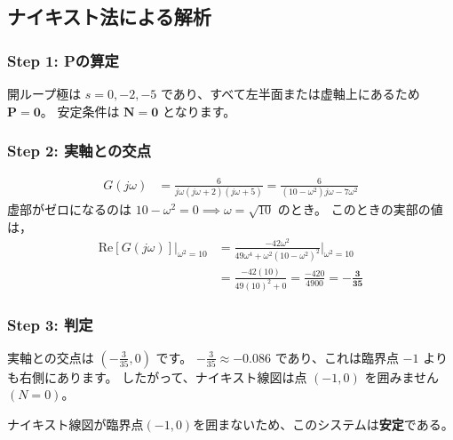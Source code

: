 \documentclass[11pt,a4paper]{ltjsarticle}
\begin{document}
\subsection{ナイキスト法による解析}
\subsubsection{Step 1: Pの算定}
開ループ極は $s=0, -2, -5$ であり、すべて左半面または虚軸上にあるため $\bm{P=0}$。
安定条件は $\bm{N=0}$ となります。

\subsubsection{Step 2: 実軸との交点}
\begin{align*}
G(j\omega) &= \frac{6}{j\omega(j\omega+2)(j\omega+5)} = \frac{6}{(10-\omega^2)j\omega - 7\omega^2}
\end{align*}
虚部がゼロになるのは $10-\omega^2=0 \implies \omega = \sqrt{10}$ のとき。
このときの実部の値は，
\begin{align*}
\text{Re}[G(j\omega)]|_{\omega^2=10} &= \frac{-42\omega^2}{49\omega^4 + \omega^2(10-\omega^2)^2} |_{\omega^2=10} \\
&= \frac{-42(10)}{49(10)^2 + 0} = \frac{-420}{4900} = \bm{-\frac{3}{35}}
\end{align*}

\subsubsection{Step 3: 判定}
実軸との交点は $(-\frac{3}{35}, 0)$ です。
$-\frac{3}{35} \approx -0.086$ であり、これは臨界点 $-1$ よりも右側にあります。
したがって、ナイキスト線図は点 $(-1,0)$ を囲みません $(N=0)$。

\begin{tcolorbox}[title=ナイキスト法による結論, colback=green!10!white, colframe=green!75!black]
    ナイキスト線図が臨界点$(-1,0)$を囲まないため、このシステムは\textbf{安定}である。
\end{tcolorbox}
\end{document}
